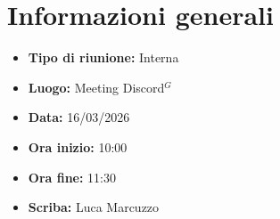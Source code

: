 \section{Informazioni generali}

\begin{itemize}
    \item \textbf{Tipo di riunione:} Interna
    \item \textbf{Luogo:} Meeting Discord$^G$
    \item \textbf{Data:} 16/03/2026
    \item \textbf{Ora inizio:} 10:00
    \item \textbf{Ora fine:} 11:30
    \item \textbf{Scriba:} Luca Marcuzzo
\end{itemize}